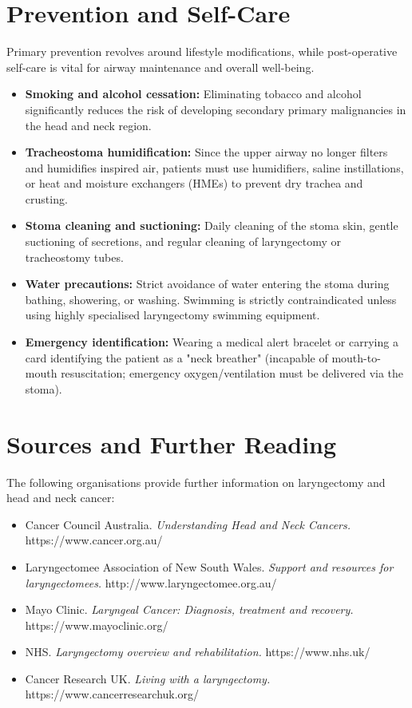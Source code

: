 \section*{Prevention and Self-Care}
Primary prevention revolves around lifestyle modifications, while post-operative self-care is vital for airway maintenance and overall well-being.
\begin{itemize}
    \item \textbf{Smoking and alcohol cessation:} Eliminating tobacco and alcohol significantly reduces the risk of developing secondary primary malignancies in the head and neck region.
    \item \textbf{Tracheostoma humidification:} Since the upper airway no longer filters and humidifies inspired air, patients must use humidifiers, saline instillations, or heat and moisture exchangers (HMEs) to prevent dry trachea and crusting.
    \item \textbf{Stoma cleaning and suctioning:} Daily cleaning of the stoma skin, gentle suctioning of secretions, and regular cleaning of laryngectomy or tracheostomy tubes.
    \item \textbf{Water precautions:} Strict avoidance of water entering the stoma during bathing, showering, or washing. Swimming is strictly contraindicated unless using highly specialised laryngectomy swimming equipment.
    \item \textbf{Emergency identification:} Wearing a medical alert bracelet or carrying a card identifying the patient as a "neck breather" (incapable of mouth-to-mouth resuscitation; emergency oxygen/ventilation must be delivered via the stoma).
\end{itemize}

\section*{Sources and Further Reading}
The following organisations provide further information on laryngectomy and head and neck cancer:
\begin{itemize}
    \item Cancer Council Australia. \textit{Understanding Head and Neck Cancers.} https://www.cancer.org.au/
    \item Laryngectomee Association of New South Wales. \textit{Support and resources for laryngectomees.} http://www.laryngectomee.org.au/
    \item Mayo Clinic. \textit{Laryngeal Cancer: Diagnosis, treatment and recovery.} https://www.mayoclinic.org/
    \item NHS. \textit{Laryngectomy overview and rehabilitation.} https://www.nhs.uk/
    \item Cancer Research UK. \textit{Living with a laryngectomy.} https://www.cancerresearchuk.org/
\end{itemize}
